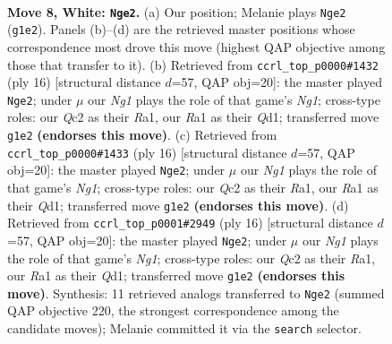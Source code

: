 \documentclass[11pt]{article}
\begin{document}
\begin{figure}[p]\centering
\begin{subfigure}{0.46\textwidth}\centering
\resizebox{\linewidth}{!}{%
\newchessgame
\chessboard[
  setfen={rnbq1rk1/pp2bppp/2p2n2/3p2B1/3P4/2N1P3/PPQ2PPP/R3KBNR w KQ - 2 8},
  showmover=false,
  pgfstyle=straightmove, color=movearrow, markmove={g1-e2}
]}
\caption{}
\end{subfigure}\hfill
\begin{subfigure}{0.46\textwidth}\centering
\resizebox{\linewidth}{!}{%
\newchessgame
\chessboard[
  setfen={rnbq1rk1/pp2bpp1/2p2n1p/3p4/3P3B/2NBP3/PP3PPP/R2QK1NR w KQ - 0 9},
  showmover=false,
  pgfstyle=straightmove, color=movearrow, markmove={g1-e2}
]}
\caption{}
\end{subfigure}
\\[4pt]
\begin{subfigure}{0.46\textwidth}\centering
\resizebox{\linewidth}{!}{%
\newchessgame
\chessboard[
  setfen={rnbq1rk1/pp2bpp1/2p2n1p/3p4/3P3B/2NBP3/PP3PPP/R2QK1NR w KQ - 0 9},
  showmover=false,
  pgfstyle=straightmove, color=movearrow, markmove={g1-e2}
]}
\caption{}
\end{subfigure}\hfill
\begin{subfigure}{0.46\textwidth}\centering
\resizebox{\linewidth}{!}{%
\newchessgame
\chessboard[
  setfen={rnbq1rk1/pp2bpp1/2p2n1p/3p4/3P3B/2NBP3/PP3PPP/R2QK1NR w KQ - 0 9},
  showmover=false,
  pgfstyle=straightmove, color=movearrow, markmove={g1-e2}
]}
\caption{}
\end{subfigure}
\caption{\textbf{Move 8, White: \texttt{Nge2}.} (a) Our position; Melanie plays \texttt{Nge2} (\texttt{g1e2}). Panels (b)--(d) are the retrieved master positions whose correspondence most drove this move (highest QAP objective among those that transfer to it). (b) Retrieved from \texttt{ccrl\_top\_p0000\#1432} (ply 16) [structural distance $d$=57, QAP obj=20]: the master played \texttt{Nge2}; under $\mu$ our \emph{Ng1} plays the role of that game's \emph{Ng1}; cross-type roles: our \emph{Q}c2 as their \emph{R}a1, our \emph{R}a1 as their \emph{Q}d1; transferred move \texttt{g1e2} \textbf{(endorses this move)}. (c) Retrieved from \texttt{ccrl\_top\_p0000\#1433} (ply 16) [structural distance $d$=57, QAP obj=20]: the master played \texttt{Nge2}; under $\mu$ our \emph{Ng1} plays the role of that game's \emph{Ng1}; cross-type roles: our \emph{Q}c2 as their \emph{R}a1, our \emph{R}a1 as their \emph{Q}d1; transferred move \texttt{g1e2} \textbf{(endorses this move)}. (d) Retrieved from \texttt{ccrl\_top\_p0001\#2949} (ply 16) [structural distance $d$=57, QAP obj=20]: the master played \texttt{Nge2}; under $\mu$ our \emph{Ng1} plays the role of that game's \emph{Ng1}; cross-type roles: our \emph{Q}c2 as their \emph{R}a1, our \emph{R}a1 as their \emph{Q}d1; transferred move \texttt{g1e2} \textbf{(endorses this move)}. Synthesis: 11 retrieved analogs transferred to \texttt{Nge2} (summed QAP objective 220, the strongest correspondence among the candidate moves); Melanie committed it via the \texttt{search} selector.}
\label{fig:thought-m14}
\end{figure}
\end{document}
